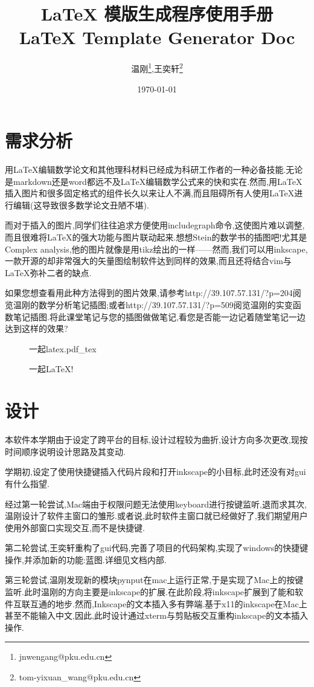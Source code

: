 \documentclass[AutoFakeBold,letterpaper,12pt,hidelinks]{article}
\title{\LaTeX{} 模版生成程序使用手册\\\LaTeX{} Template Generator Doc}
\newcommand{\incfig}[1]{%
    \def\svgwidth{\columnwidth}
    {#1.pdf_tex}
}
\begin{document}
\author{温刚\footnote{jnwengang@pku.edu.cn},王奕轩\footnote{tom-yixuan\_wang@pku.edu.cn}
  }
\date{\today}
\maketitle

\tableofcontents
\section{需求分析}%

用\LaTeX{}编辑数学论文和其他理科材料已经成为科研工作者的一种必备技能.无论是markdown还是word都远不及\LaTeX{}编辑数学公式来的快和实在.然而,用\LaTeX{}插入图片和很多固定格式的组件长久以来让人不满,而且阻碍所有人使用\LaTeX{}进行编辑(这导致很多数学论文丑陋不堪).

而对于插入的图片,同学们往往追求方便使用includegraph命令,这使图片难以调整,而且很难将\LaTeX{}的强大功能与图片联动起来.想想Stein的数学书的插图吧!尤其是Complex analysis,他的图片就像是用tikz绘出的一样——然而,我们可以用inkscape,一款开源的却非常强大的矢量图绘制软件达到同样的效果,而且还将结合vim与\LaTeX{}弥补二者的缺点.

如果您想查看用此种方法得到的图片效果,请参考http://39.107.57.131/?p=204阅览温刚的数学分析笔记插图;或者http://39.107.57.131/?p=509阅览温刚的实变函数笔记插图.将此课堂笔记与您的插图做做笔记,看您是否能一边记着随堂笔记一边达到这样的效果?


\begin{figure}[H]
    \centering
    \incfig{一起latex}
    \caption{一起\LaTeX{}!}
    \label{fig:一起latex}
\end{figure}

\section{设计}%

本软件本学期由于设定了跨平台的目标,设计过程较为曲折,设计方向多次更改,现按时间顺序说明设计思路及其变动.

学期初,设定了使用快捷键插入代码片段和打开inkscape的小目标,此时还没有对gui有什么指望.

经过第一轮尝试,Mac端由于权限问题无法使用keyboard进行按键监听,退而求其次,温刚设计了软件主窗口的雏形.或者说,此时软件主窗口就已经做好了,我们期望用户使用外部窗口实现交互,而不是快捷键.

第二轮尝试,王奕轩重构了gui代码,完善了项目的代码架构,实现了windows的快捷键操作,并添加新的功能:蓝图.详细见文档内部.

第三轮尝试,温刚发现新的模块pynput在mac上运行正常,于是实现了Mac上的按键监听.此时温刚的方向主要是inkscape的扩展.在此阶段,将inkscape扩展到了能和软件互联互通的地步.然而,Inkscape的文本插入多有弊端.基于x11的inkscape在Mac上甚至不能输入中文,因此,此时设计通过xterm与剪贴板交互重构inkscape的文本插入操作.
\end{document}
